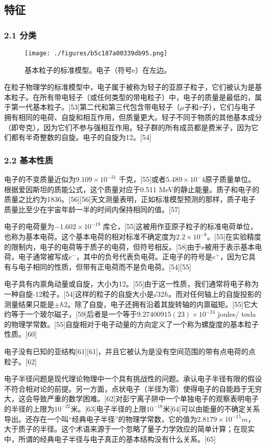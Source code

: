 \subsection{特征}
\subsubsection{2.1 分类}
\begin{figure}[ht]
\centering
\texttt{[image: ./figures/b5c187a00339db95.png]}
\caption{基本粒子的标准模型。电子（符号e）在左边。} \label{fig_DZ_5}
\end{figure}
在粒子物理学的标准模型中，电子属于被称为轻子的亚原子粒子，它们被认为是基本粒子。在所有带电轻子（或任何类型的带电粒子）中，电子的质量是最低的，属于第一代基本粒子。[53]第二代和第三代包含带电轻子（$\mu$子和$\tau$子），它们与电子拥有相同的电荷、自旋和相互作用，但质量更大。轻子不同于物质的其他基本成分（即夸克），因为它们不参与强相互作用。轻子群的所有成员都是费米子，因为它们都有半奇整数的自旋。电子的自旋为12。[54]
\subsubsection{2.2 基本性质}
电子的不变质量近似为$9.109\times10^{-31}$ 千克，[55]或者$5.489\times10^-4$原子质量单位。根据爱因斯坦的质能公式，这个质量对应于0.511 MeV的静止能量。质子和电子的质量之比约为1836。[56][56]天文测量表明，正如标准模型预测的那样，质子电子质量比至少在宇宙年龄一半的时间内保持相同的值。[57]

电子的电荷量为$-1.602\times10^{-19}$ 库仑，[55]这被用作亚原子粒子的标准电荷单位，也称为基本电荷。这个基本电荷的相对标准不确定度为$2.2\times10^{-8}$。[55]在实验精度的限制内，电子的电荷等于质子的电荷，但符号相反。[58]由于e被用于表示基本电荷，电子通常被写成$e^-$，其中的负号代表负电荷。正电子的符号是$e^+$，因为它具有与电子相同的性质，但带有正电荷而不是负电荷。[54][55]

电子具有内禀角动量或自旋，大小为12。[55]由于这一性质，我们通常将电子称为一种自旋-12粒子。[54]这样的粒子的自旋大小是√32$\hbar$。而对任何轴上的自旋投影的测量结果只能是$\pm\hbar2$。除了自旋，电子还拥有沿着其旋转轴的内禀磁矩。[55]它大约等于一个玻尔磁子，[59]后者是一个等于$9.27400915(23)\times10^{-24}$ joules/ tesla的物理学常数。[55]自旋相对于电子动量的方向定义了一个称为螺旋度的基本粒子性质。[60]

电子没有已知的亚结构[61][61]，并且它被认为是没有空间范围的带有点电荷的点粒子。[62]

电子半径问题是现代理论物理中一个具有挑战性的问题。承认电子半径有限的假设不符合相对论的前提。另一方面，点状电子（半径为零）使得电子的自能趋于无穷大，这会导致严重的数学困难。[62]对彭宁离子阱中一个单独电子的观察表明电子的半径的上限为$10^{-22}$米。[63]电子半径的上限$10^{-18}$米[64]可以由能量的不确定关系导出。还存在一个叫“经典电子半径”的物理学常数，它的值为$2.8179\times10^{-15} m$，大于质子的半径。这个术语来源于一个忽略了量子力学效应的简单计算；在现实中，所谓的经典电子半径与电子真正的基本结构没有什么关系。[65]


